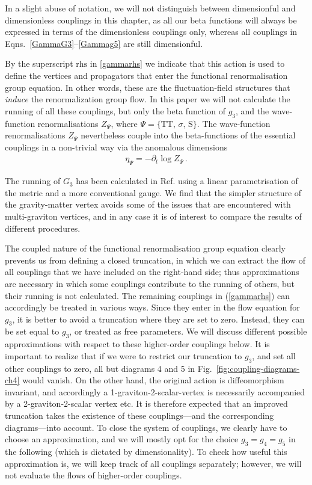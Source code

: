 \documentclass[11pt]{book}
\numberwithin{equation}{chapter}
\begin{document}
In a slight abuse of notation, we will not distinguish between dimensionful and dimensionless couplings in
this chapter,
as all our beta functions will always be expressed in terms of the dimensionless couplings only,
whereas all couplings in Eqns.~\eqref{GammaG3}--\eqref{Gammag5} are still dimensionful.

By the superscript $\mathrm{rhs}$ in \eqref{gammarhs} we indicate that this action is used to define the
vertices and propagators that enter the functional renormalisation group equation.
In other words, these are the fluctuation-field structures that \emph{induce} the renormalization group flow.
In this paper we will not calculate the running of all these couplings, but only the beta function
of $g_3$, and the wave-function renormalisations $Z_\Psi$, where $\Psi = \{ \mathrm{TT}, \, \sigma, \, \mathrm S \}$.
The wave-function renormalisations $Z_\Psi$ nevertheless couple into the beta-functions of the
essential couplings in a non-trivial way via the anomalous dimensions
\begin{align}
  \eta_\Psi = - \partial_t \log Z_\Psi \,.
\end{align}

The running of $G_3$ has been calculated in Ref. \cite{Meibohm:2015twa} using a linear
parametrisation of the metric and a more conventional gauge.
We find that the simpler structure of the gravity-matter vertex avoids some of the issues that
are encountered with multi-graviton vertices,
and in any case it is of interest to compare the results of different procedures.

The coupled nature of the functional renormalisation group equation clearly prevents
us from defining a closed truncation,
in which we can extract the flow of all couplings that we have included on the right-hand side;
thus approximations are necessary in which some couplings contribute to the running of others,
but their running is not calculated.
The remaining couplings in (\ref{gammarhs}) can accordingly be treated in various ways.
Since they enter in the flow equation for $g_3$,
it is better to avoid a truncation where they are set to zero.
Instead, they can be set equal to $g_3$, or treated as free parameters.
We will discuss different possible approximations with respect to these higher-order couplings below.
It is important to realize that if we were to restrict our truncation to $g_3$,
and set all other couplings to zero,
all but diagrams 4 and 5 in Fig.~\ref{fig:coupling-diagrams-ch4} would vanish.
On the other hand, the original action is diffeomorphism invariant,
and accordingly a 1-graviton-2-scalar-vertex is necessarily accompanied by a 2-graviton-2-scalar vertex etc.
It is therefore expected that an improved truncation takes the existence of these couplings---and
the corresponding diagrams---into account.
To close the system of couplings, we clearly have to choose an approximation,
and we will mostly opt for the choice $g_3=g_4=g_5$ in the following
(which is dictated by dimensionality). To check how useful this approximation is,
we will keep track of all couplings separately;
however, we will not evaluate the flows of higher-order couplings.
\end{document}
